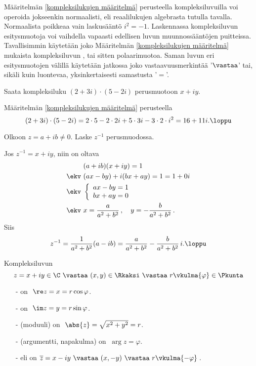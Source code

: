 Määritelmän \ref{kompleksilukujen määritelmä} perusteella kompleksiluvuilla voi operoida 
jokseenkin normaalisti, eli reaalilukujen algebrasta tutulla tavalla. Normaalista poikkeaa
vain laskusääntö $i^2=-1$. Laskennassa kompleksiluvun esitysmuotoja voi vaihdella vapaasti 
edellisen luvun muunnossääntöjen puitteissa. Tavallisimmin käytetään joko Määritelmän 
%
\ref{kompleksilukujen määritelmä} mukaista kompleksiluvun , tai sitten
polaarimuotoa. Saman luvun eri esitysmuotojen välillä käytetään jatkossa joko
vastaavuusmerkintää '$\vastaa$' tai, sikäli kuin luontevaa, yksinkertaisesti samastusta '$=$'.
\begin{Exa} Saata kompleksiluku $(2+3i)\cdot(5-2i)$ perusmuotoon $x+iy$. \end{Exa}
\ratk Määritelmän \ref{kompleksilukujen määritelmä} perusteella
\[
(2+3i)\cdot(5-2i) = 2\cdot 5 - 2\cdot 2i + 5\cdot 3i - 3\cdot 2\cdot i^2 = 16+11i. \loppu
\]
\begin{Exa} Olkoon $z=a+ib \neq 0$. Laske $z^{-1}$ perusmuodossa. \end{Exa}
\ratk Jos $z^{-1}=x+iy$, niin on oltava
\begin{align*}
&(a+ib)(x+iy)=1 \\
\ekv \ &(ax-by)+i(bx+ay)=1=1+0i \\
\ekv \ &\left\{ \begin{array}{ll}
ax-by=1 \\
bx+ay=0
\end{array} \right. \\
\ekv \ & x=\frac{a}{a^2+b^2}\,, \quad y=-\frac{b}{a^2+b^2}\,.
\end{align*}
Siis
\[
z^{-1}=\frac{1}{a^2+b^2}(a-ib) = \frac{a}{a^2+b^2} - \frac{b}{a^2+b^2}\,i. \loppu
\]
\begin{Def} \label{kompleksilukujen terminologiaa}
  
   
 
Kompleksiluvun
\[
z=x+iy \in \C \ \vastaa \ (x,y) \in \Rkaksi \ \vastaa \ r \vkulma{\varphi} \in \Pkunta
\]
\begin{itemize}
\item[-]  on $\ \re z = x = r \cos{\varphi}$.
\item[-]  on $\ \im z = y = r \sin{\varphi}$.
\item[-]  (moduuli) on $\ \abs{z}=\sqrt{x^2+y^2}=r$.
\item[-]  (argumentti, napakulma) on $\ \arg z = \varphi$.
\item[-]  eli  on 
              $\overline{z}=x-iy \ \vastaa \ (x,-y) \ \vastaa \ r \vkulma{-\varphi}\,$.
\end{itemize}
\end{Def}
